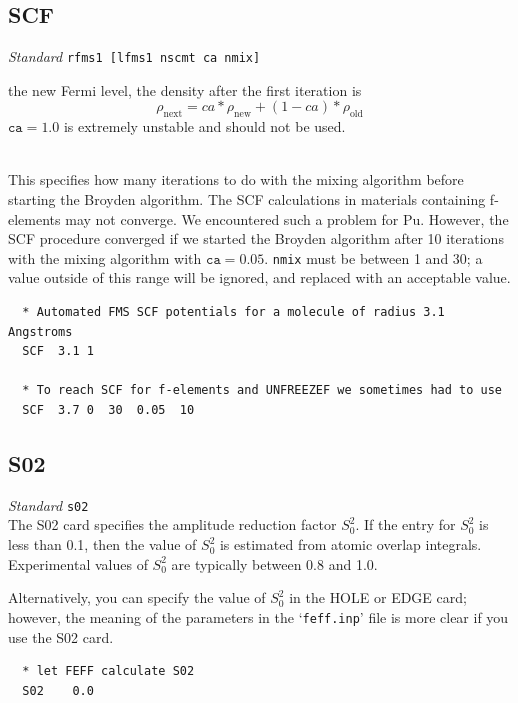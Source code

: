 \documentclass[11pt,oneside]{report} %
\renewcommand{\htmlref}[2]{\hyperlink{#2}{#1}}
\newenvironment{Card}[4]%
      {\vspace{3ex}%
        \subsection{#1}
        \quad\textsl{#3}\newline
        \quad\texttt{#2}\newline%
        \label{card:#4}\\}
      {}
\newcommand{\file}[1]{`\texttt{#1}'}
\renewcommand{\htmlref}[2]{{#1}} %
\begin{document}
\begin{Card}{SCF}{rfms1 [lfms1 nscmt ca nmix]}{Standard}{scf}
\begin{description}
    the new Fermi level, the density after the first iteration is
    $$\rho_\mathrm{next} = ca*\rho_\mathrm{new} + (1-ca)*\rho_\mathrm{old}$$ 
    $\mathtt{ca}=1.0$ is extremely unstable and should not be used.
  \item[\texttt{nmix}]\hfill\\ This specifies how many iterations to do 
    with the mixing algorithm before starting the Broyden algorithm.
    The SCF calculations in materials containing f-elements may not converge. 
    We encountered such a
    problem for Pu. However, the SCF procedure converged if we started the
    Broyden algorithm after 10 iterations with the mixing algorithm with
    $\mathtt{ca}=0.05$.  \texttt{nmix} must be between 1 and 30; a value 
    outside of this range will be ignored, and replaced with an acceptable 
    value.
  \end{description}

\begin{verbatim}
  * Automated FMS SCF potentials for a molecule of radius 3.1 Angstroms
  SCF  3.1 1

  * To reach SCF for f-elements and UNFREEZEF we sometimes had to use
  SCF  3.7 0  30  0.05  10
\end{verbatim}
\end{Card}



\begin{Card}{S02}{s02}{Standard}{s02}
  The S02 card specifies the amplitude reduction factor $S_0^2$. If
  the entry for $S_0^2$ is less than 0.1, then the value of $S_0^2$ is
  estimated from atomic overlap integrals. Experimental values of
  $S_0^2$ are typically between 0.8 and 1.0.

  Alternatively, you can specify the value of $S_0^2$ in the 
  \htmlref{HOLE}{card:hol} or \htmlref{EDGE}{card:edg} card; however, 
  the meaning of the parameters in the \file{feff.inp} file is more 
  clear if you use the S02 card.
\begin{verbatim}
  * let FEFF calculate S02
  S02    0.0
\end{verbatim}
\end{Card}
\end{document}
